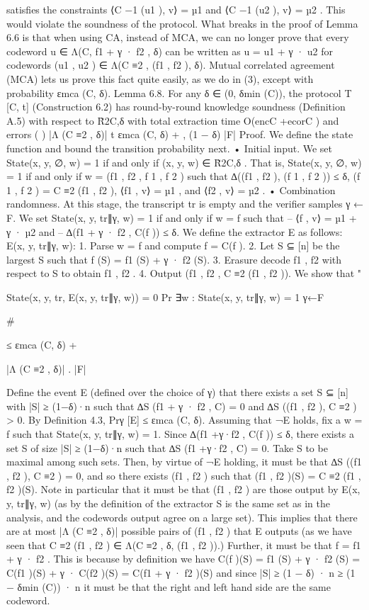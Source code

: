 \documentclass[11pt]{article}
\begin{document}
satisfies the constraints ⟨C −1 (u1 ), v⟩ = µ1 and ⟨C −1 (u2 ), v⟩ = µ2 . This would violate the soundness
of the protocol. What breaks in the proof of Lemma 6.6 is that when using CA, instead of MCA,
we can no longer prove that every codeword u ∈ Λ(C, f1 + γ · f2 , δ) can be written as u = u1 + γ · u2
for codewords (u1 , u2 ) ∈ Λ(C ≡2 , (f1 , f2 ), δ). Mutual correlated agreement (MCA) lets us prove this
fact quite easily, as we do in (3), except with probability εmca (C, δ).
Lemma 6.8. For any δ ∈ (0, δmin (C)), the protocol T [C, t] (Construction 6.2) has round-by-round
knowledge soundness (Definition A.5) with respect to R̃2C,δ with total extraction time O(encC +ecorC )
and errors
(
)
|Λ (C ≡2 , δ)|
t
εmca (C, δ) +
, (1 − δ)
|F|
Proof. We define the state function and bound the transition probability next.
• Initial input. We set State(x, y, ∅, w) = 1 if and only if (x, y, w) ∈ R̃2C,δ . That is, State(x, y, ∅, w) =
1 if and only if w = (f1 , f2 , f 1 , f 2 ) such that ∆((f1 , f2 ), (f 1 , f 2 )) ≤ δ, (f 1 , f 2 ) = C ≡2 (f1 , f2 ),
⟨f1 , v⟩ = µ1 , and ⟨f2 , v⟩ = µ2 .
• Combination randomness. At this stage, the transcript tr is empty and the verifier samples
γ ← F. We set State(x, y, tr∥γ, w) = 1 if and only if w = f such that
– ⟨f , v⟩ = µ1 + γ · µ2 and
– ∆(f1 + γ · f2 , C(f )) ≤ δ.
We define the extractor E as follows:
E(x, y, tr∥γ, w):
1. Parse w = f and compute f = C(f ).
2. Let S ⊆ [n] be the largest S such that f (S) = f1 (S) + γ · f2 (S).
3. Erasure decode f1 , f2 with respect to S to obtain f1 , f2 .
4. Output (f1 , f2 , C ≡2 (f1 , f2 )).
We show that
"

State(x, y, tr, E(x, y, tr∥γ, w)) = 0
Pr ∃w :
State(x, y, tr∥γ, w) = 1
γ←F

\#

≤ εmca (C, δ) +

|Λ (C ≡2 , δ)|
.
|F|

Define the event E (defined over the choice of γ) that there exists a set S ⊆ [n] with |S| ≥ (1−δ)·n
such that ∆S (f1 + γ · f2 , C) = 0 and ∆S ((f1 , f2 ), C ≡2 ) > 0. By Definition 4.3, Prγ [E] ≤ εmca (C, δ).
Assuming that ¬E holds, fix a w = f such that State(x, y, tr∥γ, w) = 1.
Since ∆(f1 +γ·f2 , C(f )) ≤ δ, there exists a set S of size |S| ≥ (1−δ)·n such that ∆S (f1 +γ·f2 , C) =
0. Take S to be maximal among such sets. Then, by virtue of ¬E holding, it must be that
∆S ((f1 , f2 ), C ≡2 ) = 0, and so there exists (f1 , f2 ) such that (f1 , f2 )(S) = C ≡2 (f1 , f2 )(S).
Note in particular that it must be that (f1 , f2 ) are those output by E(x, y, tr∥γ, w) (as by the
definition of the extractor S is the same set as in the analysis, and the codewords output agree
on a large set). This implies that there are at most |Λ (C ≡2 , δ)| possible pairs of (f1 , f2 ) that E
outputs (as we have seen that C ≡2 (f1 , f2 ) ∈ Λ(C ≡2 , δ, (f1 , f2 )).)
Further, it must be that f = f1 + γ · f2 . This is because by definition we have C(f )(S) = f1 (S) +
γ · f2 (S) = C(f1 )(S) + γ · C(f2 )(S) = C(f1 + γ · f2 )(S) and since |S| ≥ (1 − δ) · n ≥ (1 − δmin (C)) · n
it must be that the right and left hand side are the same codeword.
\end{document}
